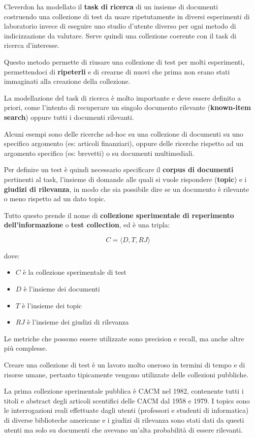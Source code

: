 Cleverdon ha modellato il \textbf{task di ricerca} di un insieme di documenti costruendo {\color{Red}una collezione di test da usare ripetutamente in diversi esperimenti di laboratorio} invece di eseguire uno studio d'utente diverso per ogni metodo di indicizzazione da valutare.
Serve quindi una collezione coerente con il task di ricerca d'interesse.

Questo metodo permette di riusare una collezione di test per molti esperimenti, permettendoci di \textbf{ripeterli} e di crearne di nuovi che prima non erano stati immaginati alla creazione della collezione.

La modellazione del task di ricerca è molto importante e deve essere definito a priori, come l'intento di recuperare un singolo documento rilevante (\textbf{known-item search}) oppure tutti i documenti rilevanti.

Alcuni esempi sono delle ricerche ad-hoc su una collezione di documenti su uno specifico argomento (es: articoli finanziari), oppure delle ricerche rispetto ad un argomento specifico (es: brevetti) o su documenti multimediali.

Per definire un test è quindi necessario specificare il \textbf{corpus di documenti} pertinenti al task, l'insieme di domande alle quali si vuole rispondere (\textbf{topic}) e i \textbf{giudizi di rilevanza}, in modo che sia possibile dire se un documento è rilevante o meno rispetto ad un dato topic.

Tutto questo prende il nome di \textbf{collezione sperimentale di reperimento dell'informazione} o \textbf{test collection}, ed è una tripla:

$$
C = \langle D, T, RJ\rangle
$$

\noindent dove:
\begin{itemize}
	\item $C$ è la collezione sperimentale di test
	\item $D$ è l'insieme dei documenti
	\item $T$ è l'insieme dei topic
	\item $RJ$ è l'insieme dei giudizi di rilevanza
\end{itemize}

\noindent Le metriche che possono essere utilizzate sono precision e recall, ma anche altre più complesse.

Creare una collezione di test è un lavoro molto oneroso in termini di tempo e di risorse umane, pertanto tipicamente vengono utilizzate delle collezioni pubbliche.

La prima collezione sperimentale pubblica è CACM nel 1982, contenente tutti i titoli e abstract degli articoli scentifici delle CACM dal 1958 e 1979. I topics sono le interrogazioni reali effettuate dagli utenti (professori e studenti di informatica) di diverse biblioteche americane e i giudizi di rilevanza sono stati dati da questi utenti ma solo su documenti che avevano un'alta probabilità di essere rilevanti.













